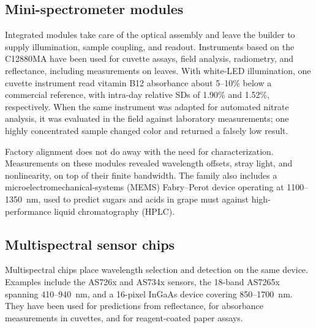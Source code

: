 \subsection{Mini-spectrometer modules}

Integrated modules take care of the optical assembly and leave the builder to supply illumination, sample coupling, and readout. Instruments based on the C12880MA have been used for cuvette assays, field analysis, radiometry, and reflectance,\citep{laganovska2020portable,bulusu2024technical,tunens2024optical,troscianko2023osprad,jechow2024characterizing} including measurements on leaves.\citep{leccisi2025low} With white-LED illumination, one cuvette instrument read vitamin B12 absorbance about 5--10\% below a commercial reference, with intra-day relative SDs of 1.90\% and 1.52\%, respectively.\citep{laganovska2020portable} When the same instrument was adapted for automated nitrate analysis, it was evaluated in the field against laboratory measurements; one highly concentrated sample changed color and returned a falsely low result.\citep{bulusu2024technical}

Factory alignment does not do away with the need for characterization. Measurements on these modules revealed wavelength offsets, stray light, and nonlinearity, on top of their finite bandwidth.\citep{hotra2022investigation,jechow2024characterizing,firago2022diffuse,troscianko2023osprad} The family also includes a microelectromechanical-systems (MEMS) Fabry--Perot device operating at 1100--1350~nm, used to predict sugars and acids in grape must against high-performance liquid chromatography (HPLC).\citep{krause2021smartspectrometer}

\subsection{Multispectral sensor chips}

Multispectral chips place wavelength selection and detection on the same device. Examples include the AS726x and AS734x sensors,\citep{lopin2025evaluation,yu2023open} the 18-band AS7265x spanning 410--940~nm,\citep{tran2020portable} and a 16-pixel InGaAs device covering 850--1700~nm.\citep{ou2022spectral} They have been used for predictions from reflectance,\citep{sutherland2024synchronising,noguera2022new} for absorbance measurements in cuvettes,\citep{liao2020portable,srivastava2021ultra,yu2023open,daurai2023comparison} and for reagent-coated paper assays.\citep{palekar2025microfluidic}

